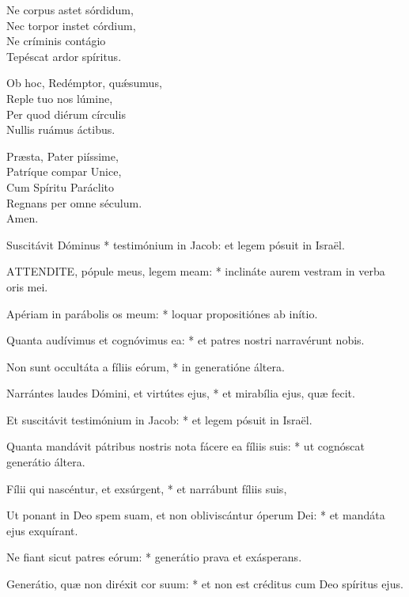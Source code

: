Ne corpus astet sórdidum,\\
Nec torpor instet córdium,\\
Ne críminis contágio\\
Tepéscat ardor spíritus.

Ob hoc, Redémptor, quǽsumus,\\
Reple tuo nos lúmine,\\
Per quod diérum círculis\\
Nullis ruámus áctibus.

Præsta, Pater piíssime,\\
Patríque compar Unice,\\
Cum Spíritu Paráclito\\
Regnans per omne séculum.\\
Amen.



 Suscitávit Dóminus * testimónium in Jacob: et legem pósuit in Israël.


\lettrine[lines=2]{A}{TTENDITE}, pópule meus, legem meam: * inclináte aurem vestram in verba oris mei.

Apériam in parábolis os meum: * loquar propositiónes ab inítio.

Quanta audívimus et cognóvimus ea: * et patres nostri narravérunt nobis.

Non sunt occultáta a fíliis eórum, * in generatióne áltera.

Narrántes laudes Dómini, et virtútes ejus, * et mirabília ejus, quæ fecit.

Et suscitávit testimónium in Jacob: * et legem pósuit in Israël.

Quanta mandávit pátribus nostris nota fácere ea fíliis suis: * ut cognóscat generátio áltera.

Fílii qui nascéntur, et exsúrgent, * et narrábunt fíliis suis,

Ut ponant in Deo spem suam, et non obliviscántur óperum Dei: * et mandáta ejus exquírant.

Ne fiant sicut patres eórum: * generátio prava et exásperans.

Generátio, quæ non diréxit cor suum: * et non est créditus cum Deo spíritus ejus.

